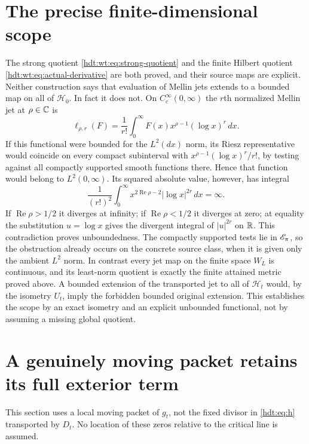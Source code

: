 \documentclass[11pt]{article}
\begin{document}
\section{The precise finite-dimensional scope}
\label{hdt:wt:sec:scope}

The strong quotient \eqref{hdt:wt:eq:strong-quotient} and the finite
Hilbert quotient \eqref{hdt:wt:eq:actual-derivative} are both proved,
and their source maps are explicit.  Neither construction says
that evaluation of Mellin jets extends to a bounded map on all
of $\mathcal H_0$.  In fact it does not.  On $C_c^\infty(0,\infty)$
the $r$th normalized Mellin jet at $\rho\in\mathbb C$ is
\[
 \ell_{\rho,r}(F)=\frac1{r!}\int_0^\infty
       F(x)x^{\rho-1}(\log x)^r\,dx.
\]
If this functional were bounded for the $L^2(dx)$ norm, its
Riesz representative would coincide on every compact subinterval
with $x^{\overline\rho-1}(\log x)^r/r!$, by testing against
all compactly supported smooth functions there.  Hence that
function would belong to $L^2(0,\infty)$.  Its squared absolute
value, however, has integral
\[
 \frac1{(r!)^2}\int_0^\infty
   x^{2\operatorname{Re}\rho-2}|\log x|^{2r}\,dx=\infty.
\]
If $\operatorname{Re}\rho>1/2$ it diverges at infinity;
if $\operatorname{Re}\rho<1/2$ it diverges at zero; at equality
the substitution $u=\log x$ gives the divergent integral of
$|u|^{2r}$ on $\mathbb R$.  This contradiction proves unboundedness.
The compactly supported tests lie in $\mathscr E_\pi$, so the obstruction
already occurs on the concrete source class, when it is given
only the ambient $L^2$ norm.  In contrast every jet map on the
finite space $W_L$ is continuous, and its least-norm quotient
is exactly the finite attained metric proved above.  A bounded
extension of the transported jet to all of $\mathcal H_t$ would, by the
isometry $U_t$, imply the forbidden bounded original extension.
This establishes the scope by an exact isometry and an explicit
unbounded functional, not by assuming a missing global quotient.


\section{A genuinely moving packet retains its full exterior term}

This section uses a local moving packet of $g_t$, not the fixed
divisor in \eqref{hdt:eq:h} transported by $D_t$. No location of these
zeros relative to the critical line is assumed.
\end{document}
